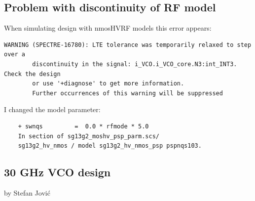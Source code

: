 







\subsection{Problem with discontinuity of RF model}

When simulating design with nmosHVRF models this error appears:

\begin{verbatim}
WARNING (SPECTRE-16780): LTE tolerance was temporarily relaxed to step over a 
		discontinuity in the signal: i_VCO.i_VCO_core.N3:int_INT3. Check the design 
		or use '+diagnose' to get more information.
        Further occurrences of this warning will be suppressed
\end{verbatim}

I changed the model parameter:
\begin{verbatim}
	+ swnqs         =  0.0 * rfmode * 5.0
	In section of sg13g2_moshv_psp_parm.scs/ 
	sg13g2_hv_nmos / model sg13g2_hv_nmos_psp pspnqs103.		
\end{verbatim}

\subsection{30 GHz VCO design}
by Stefan Jović

